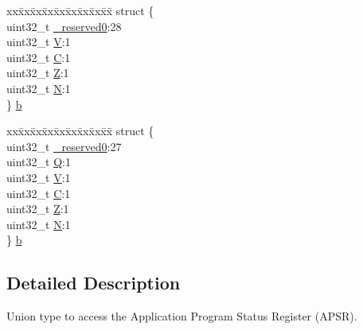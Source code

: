 \begin{DoxyCompactItemize}
\begin{tabbing}
\end{tabbing}\item 
\begin{tabbing}
xx\=xx\=xx\=xx\=xx\=xx\=xx\=xx\=xx\=\kill
struct \{\\
\>uint32\_t \mbox{\hyperlink{union_a_p_s_r___type_afbce95646fd514c10aa85ec0a33db728}{\_reserved0}}:28\\
\>uint32\_t \mbox{\hyperlink{union_a_p_s_r___type_a8004d224aacb78ca37774c35f9156e7e}{V}}:1\\
\>uint32\_t \mbox{\hyperlink{union_a_p_s_r___type_a86e2c5b891ecef1ab55b1edac0da79a6}{C}}:1\\
\>uint32\_t \mbox{\hyperlink{union_a_p_s_r___type_a3b04d58738b66a28ff13f23d8b0ba7e5}{Z}}:1\\
\>uint32\_t \mbox{\hyperlink{union_a_p_s_r___type_a7e7bbba9b00b0bb3283dc07f1abe37e0}{N}}:1\\
\} \mbox{\hyperlink{union_a_p_s_r___type_a5885cdad9332135e09169739d2fbbf92}{b}}\\

\end{tabbing}\item 
\begin{tabbing}
xx\=xx\=xx\=xx\=xx\=xx\=xx\=xx\=xx\=\kill
struct \{\\
\>uint32\_t \mbox{\hyperlink{union_a_p_s_r___type_afbce95646fd514c10aa85ec0a33db728}{\_reserved0}}:27\\
\>uint32\_t \mbox{\hyperlink{union_a_p_s_r___type_a22d10913489d24ab08bd83457daa88de}{Q}}:1\\
\>uint32\_t \mbox{\hyperlink{union_a_p_s_r___type_a8004d224aacb78ca37774c35f9156e7e}{V}}:1\\
\>uint32\_t \mbox{\hyperlink{union_a_p_s_r___type_a86e2c5b891ecef1ab55b1edac0da79a6}{C}}:1\\
\>uint32\_t \mbox{\hyperlink{union_a_p_s_r___type_a3b04d58738b66a28ff13f23d8b0ba7e5}{Z}}:1\\
\>uint32\_t \mbox{\hyperlink{union_a_p_s_r___type_a7e7bbba9b00b0bb3283dc07f1abe37e0}{N}}:1\\
\} \mbox{\hyperlink{union_a_p_s_r___type_a46fb8779e294d82ba0cd2941fdb94366}{b}}\\

\end{tabbing}\end{DoxyCompactItemize}


\subsection{Detailed Description}
Union type to access the Application Program Status Register (A\+P\+SR). 

